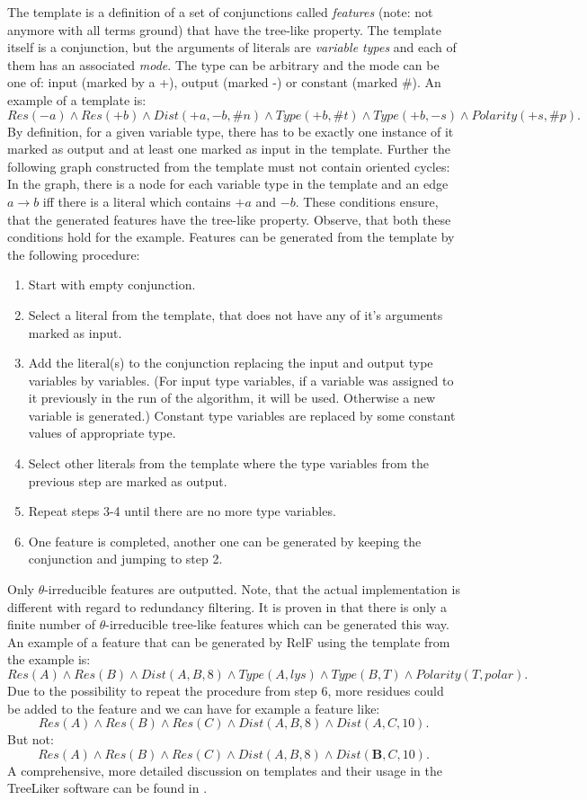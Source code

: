 \documentclass[11pt,twoside,a4paper]{book}
\begin{document}
The template is a definition of a set of conjunctions called \emph{features}
(note: not anymore with all terms ground)
that have the tree-like property. 
The template itself is a conjunction,
but the arguments of literals are \emph{variable types} and each of them has an associated \emph{mode}.
The type can be arbitrary and the mode can be one of:
input (marked by a +), output (marked -) or constant (marked \#).
An example of a template is:
\[ Res(-a)\land Res(+b)\land Dist(+a, -b, \#n)\land Type(+b, \#t)\land Type(+b, -s)\land Polarity(+s, \#p). \]
By definition, for a given variable type, there has to be exactly one instance of it 
marked as output and at least one marked as input in the template.
Further the following graph constructed from the template must not contain oriented cycles: 
In the graph, there is a node for each variable type in the template and an edge $a \rightarrow b$
iff there is a literal which contains $+a$ and $-b$.
These conditions ensure,
that the generated features have the tree-like property.
Observe, that both these conditions hold for the example.
Features can be generated from the template by the following procedure:
\begin{enumerate}
 \item Start with empty conjunction.
 \item Select a literal from the template, that does not have any of it's arguments marked as input.
 \item Add the literal(s) to the conjunction replacing the input and output type variables by variables.
       (For input type variables, if a variable was assigned to it previously in the run of the algorithm,
       it will be used. Otherwise a new variable is generated.)
       Constant type variables are replaced by some constant values of appropriate type.
 \item Select other literals from the template where the type variables from the previous step are marked as output.
 \item Repeat steps 3-4 until there are no more type variables.
 \item One feature is completed, another one can be generated by keeping the conjunction and jumping to step 2.
\end{enumerate}
Only $\theta$-irreducible features are outputted. 
Note, that the actual implementation is different with regard to redundancy filtering. 
It is proven in \cite{relf} that there is only a finite number of $\theta$-irreducible tree-like features
which can be generated this way.
An example of a feature that can be generated by RelF using the template from the example is:
\[ Res(A) \land Res(B)\land Dist(A,B,8)\land Type(A, lys)\land Type(B, T)\land Polarity(T, polar). \]
Due to the possibility to repeat the procedure from step 6,
more residues could be added to the feature and we can have for example a feature like:
\[ Res(A)\land Res(B)\land Res(C)\land Dist(A,B,8)\land Dist(A,C,10). \]
But not:
\[ Res(A)\land Res(B)\land Res(C)\land Dist(A,B,8)\land Dist(\mathbf{B},C,10). \]
A comprehensive, more detailed discussion on templates and their usage in the TreeLiker software
can be found in \cite{szabova}.
\end{document}
